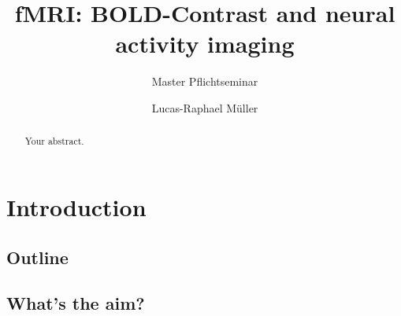 \documentclass[a4paper]{scrartcl}
\begin{document}
\title{fMRI: BOLD-Contrast and neural activity imaging}
\subtitle{Master Pflichtseminar}
\author{Lucas-Raphael Müller}
\maketitle

\begin{abstract}
Your abstract.
\end{abstract}

\tableofcontents


\listoftodos[Notes]

\newpage

\section{Introduction}
\label{sec:intro}

\subsection{Outline}
\subsection{What's the aim?}
\end{document}
